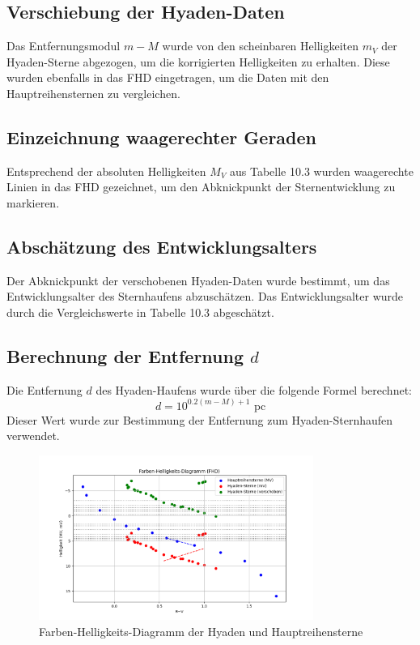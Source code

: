\documentclass[a4paper,12pt]{article}
\begin{document}
\subsection*{Verschiebung der Hyaden-Daten}
Das Entfernungsmodul \( m - M \) wurde von den scheinbaren Helligkeiten \( m_V \) der Hyaden-Sterne abgezogen, um die korrigierten Helligkeiten zu erhalten. Diese wurden ebenfalls in das FHD eingetragen, um die Daten mit den Hauptreihensternen zu vergleichen.

\subsection*{Einzeichnung waagerechter Geraden}
Entsprechend der absoluten Helligkeiten \( M_V \) aus Tabelle 10.3 wurden waagerechte Linien in das FHD gezeichnet, um den Abknickpunkt der Sternentwicklung zu markieren.

\subsection*{Abschätzung des Entwicklungsalters}
Der Abknickpunkt der verschobenen Hyaden-Daten wurde bestimmt, um das Entwicklungsalter des Sternhaufens abzuschätzen. Das Entwicklungsalter wurde durch die Vergleichswerte in Tabelle 10.3 abgeschätzt.

\subsection*{Berechnung der Entfernung \( d \)}
Die Entfernung \( d \) des Hyaden-Haufens wurde über die folgende Formel berechnet:
\[
d = 10^{0.2(m - M) + 1} \text{ pc}
\]
Dieser Wert wurde zur Bestimmung der Entfernung zum Hyaden-Sternhaufen verwendet.

\begin{figure}[H]
    \centering
    \includegraphics[width=0.8\textwidth]{Hyaden_FHD.png}
    \caption{Farben-Helligkeits-Diagramm der Hyaden und Hauptreihensterne}
    \label{fig:FHD}
\end{figure}
\end{document}
